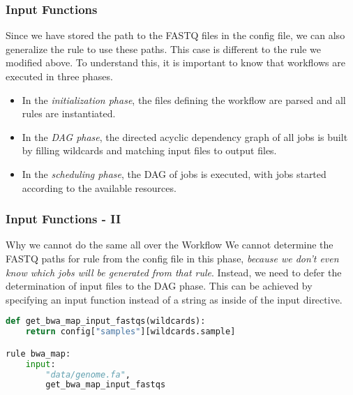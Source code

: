 \begin{frame}[fragile]
  \frametitle{Input Functions}
  Since we have stored the path to the FASTQ files in the config file, we can also generalize the rule  to use these paths. This case is different to the rule  we modified above. To understand this, it is important to know that \Snakemake{} workflows are executed in three phases.
  \begin{itemize}[<+->]
   \item In the \emph{initialization phase}, the files defining the workflow are parsed and all rules are instantiated.
   \item In the \emph{DAG phase}, the directed acyclic dependency graph of all jobs is built by filling wildcards and matching input files to output files.
   \item In the \emph{scheduling phase}, the DAG of jobs is executed, with jobs started according to the available resources.
  \end{itemize}
\end{frame}

\begin{frame}[fragile]
  \frametitle{Input Functions - II}
    \begin{alertblock}{Why we cannot do the same all over the Workflow}
    We cannot determine the FASTQ paths for rule  from the config file in this phase, \emph{because we don’t even know which jobs will be generated from that rule}. Instead, we need to defer the determination of input files to the DAG phase. This can be achieved by specifying an input function instead of a string as inside of the input directive.
  \end{alertblock}
  \begin{lstlisting}[language=Python,style=Python]
def get_bwa_map_input_fastqs(wildcards):
    return config["samples"][wildcards.sample]

rule bwa_map:
    input:
        "data/genome.fa",
        get_bwa_map_input_fastqs
  \end{lstlisting}
\end{frame}

